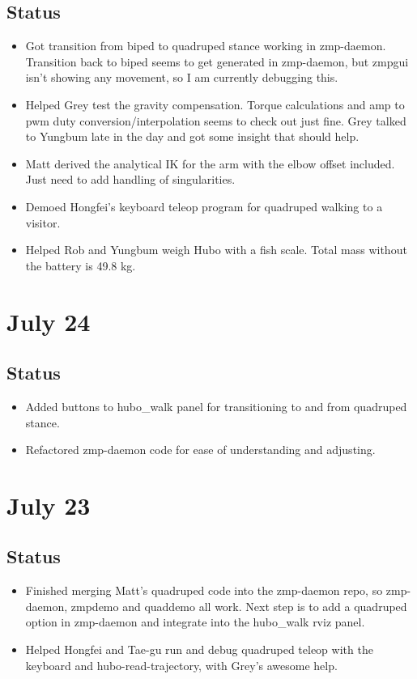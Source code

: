 \documentclass[letterpaper, 10 pt]{report}
\begin{document}
\subsection*{Status}
\begin{itemize}
\item Got transition from biped to quadruped stance working in zmp-daemon. Transition back to biped seems to get generated in zmp-daemon, but zmpgui isn't showing any movement, so I am currently debugging this.
\item Helped Grey test the gravity compensation. Torque calculations and amp to pwm duty conversion/interpolation seems to check out just fine. Grey talked to Yungbum late in the day and got some insight that should help.
\item Matt derived the analytical IK for the arm with the elbow offset included. Just need to add handling of singularities.
\item Demoed Hongfei's keyboard teleop program for quadruped walking to a visitor.
\item Helped Rob and Yungbum weigh Hubo with a fish scale. Total mass without the battery is 49.8 kg.
\end{itemize}

\section*{July 24}
\subsection*{Status}
\begin{itemize}
\item Added buttons to hubo\_walk panel for transitioning to and from quadruped stance.
\item Refactored zmp-daemon code for ease of understanding and adjusting.
\end{itemize}

\section*{July 23}
\subsection*{Status}
\begin{itemize}
\item Finished merging Matt's quadruped code into the zmp-daemon repo, so zmp-daemon, zmpdemo and quaddemo all work. Next step is to add a quadruped option in zmp-daemon and integrate into the hubo\_walk rviz panel.
\item Helped Hongfei and Tae-gu run and debug quadruped teleop with the keyboard and hubo-read-trajectory, with Grey's awesome help.
\end{itemize}
\end{document}
